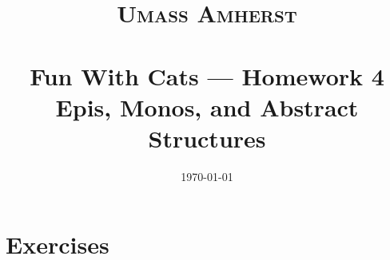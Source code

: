 %
%
%
%



\title{\normalfont\normalsize 
\textsc{Umass Amherst} \\ [10pt]%
\horrule{0.5pt} \\[0.4cm] %
\huge Fun With Cats --- Homework 4 \\
\normalsize Epis, Monos, and Abstract Structures
\horrule{2pt} \\[-0.8cm] %
}
\author{}
\date{\normalsize\today}

\maketitle

\section{Exercises}

